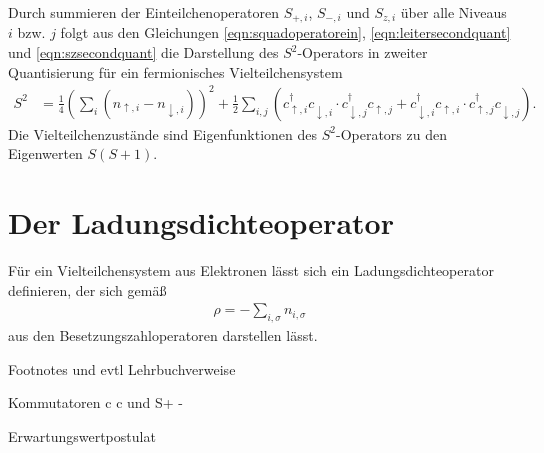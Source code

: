 Durch summieren der Einteilchenoperatoren $S_{+,i}$, $S_{-,i}$ und $S_{z,i}$ über alle Niveaus $i$ bzw. $j$ folgt aus den Gleichungen \eqref{eqn:squadoperatorein}, \eqref{eqn:leitersecondquant}
und \eqref{eqn:szsecondquant} die Darstellung des $S^2$-Operators in zweiter Quantisierung für ein fermionisches Vielteilchensystem
\begin{align}
  S^2 & = \frac14 \left(\sum_{i} \left( n_{\uparrow,i} - n_{\downarrow,i}\right)\right)^2 +
  \frac12  \sum_{i,j}\left( c_{\uparrow,i}^\dag c_{\downarrow,i}^{\phantom{\dag}} \cdot c_{\downarrow,j}^\dag c_{\uparrow,j}^{\phantom{\dag}} +
  c_{\downarrow,i}^\dag c_{\uparrow,i}^{\phantom{\dag}} \cdot c_{\uparrow,j}^\dag c_{\downarrow,j}^{\phantom{\dag}} \right) .
  \label{eqn:squadoperatorviel}
\end{align}
Die Vielteilchenzustände sind Eigenfunktionen des $S^2$-Operators zu den Eigenwerten $S(S+1)$.
\cite{???}

\section{Der Ladungsdichteoperator}

Für ein Vielteilchensystem aus Elektronen lässt sich ein Ladungsdichteoperator definieren, der sich gemäß
\begin{align}
  \rho = -\sum_{i,\sigma} n_{i,\sigma}
  \label{eqn:ladungsdichteoperator}
\end{align}
aus den Besetzungszahloperatoren darstellen lässt.
\cite{cy}


Footnotes und evtl Lehrbuchverweise

Kommutatoren c c und S+ -

Erwartungswertpostulat
